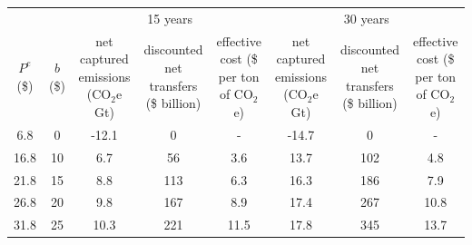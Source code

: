 \begin{tabular}{cccccccc}
\toprule
&& \multicolumn{3}{c}{15 years} & \multicolumn{3}{c}{30 years} \\
\cmidrule[1pt](r){3-5} \cmidrule[1pt](r){6-8}
\makecell[c]{$P^e$ \\ (\$)} & \makecell[c]{$b$ \\ (\$)} & \makecell[c]{net captured \\ emissions \\ (CO$_2$e Gt)} & \makecell[c]{discounted \\ net transfers \\  (\$ billion)} & \makecell[c]{  effective cost \\ (\$ per ton \\ of CO$_2$e)} & \makecell[c]{net captured \\ emissions \\ (CO$_2$e Gt)} & \makecell[c]{discounted \\ net transfers \\ (\$ billion)} & \makecell[c]{  effective cost \\ (\$ per ton \\ of CO$_2$e)} \\
\midrule

6.8 & 0 & -12.1 & 0 & - & -14.7 & 0 & - \\
16.8 & 10 & 6.7 & 56 & 3.6 & 13.7 & 102 & 4.8 \\
21.8 & 15 & 8.8 & 113 & 6.3 & 16.3 & 186 & 7.9 \\
26.8 & 20 & 9.8 & 167 & 8.9 & 17.4 & 267 & 10.8 \\
31.8 & 25 & 10.3 & 221 & 11.5  & 17.8 & 345 & 13.7 \\
\bottomrule
\end{tabular}
